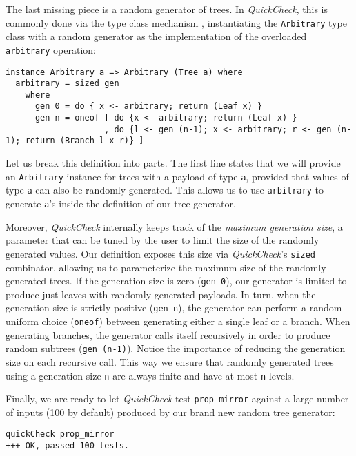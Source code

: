 \documentclass[sigconf, anonymous]{acmart}
\newcommand{\quickcheck}{\textit{QuickCheck}\xspace}
\begin{document}
The last missing piece is a random generator of trees.
%
In \quickcheck, this is commonly done via the type class mechanism
\cite{jones1997type}, instantiating the \texttt{Arbitrary} type class with a
random generator as the implementation of the overloaded \texttt{arbitrary}
operation:

\begin{verbatim}
instance Arbitrary a => Arbitrary (Tree a) where
  arbitrary = sized gen
    where
      gen 0 = do { x <- arbitrary; return (Leaf x) }
      gen n = oneof [ do {x <- arbitrary; return (Leaf x) }
                    , do {l <- gen (n-1); x <- arbitrary; r <- gen (n-1); return (Branch l x r)} ]
\end{verbatim}

\noindent Let us break this definition into parts.
%
The first line states that we will provide an \texttt{Arbitrary} instance for
trees with a payload of type \texttt{a}, provided that values of type \texttt{a}
can also be randomly generated.
%
This allows us to use \texttt{arbitrary} to generate \texttt{a}'s inside the
definition of our tree generator.


Moreover, \quickcheck internally keeps track of the \emph{maximum generation
  size}, a parameter that can be tuned by the user to limit the size of the
randomly generated values.
%
Our definition exposes this size via \quickcheck's \texttt{sized} combinator,
allowing us to parameterize the maximum size of the randomly generated trees.
%
If the generation size is zero (\texttt{gen 0}), our generator is limited to
produce just leaves with randomly generated payloads.
%
In turn, when the generation size is strictly positive (\texttt{gen n}), the
generator can perform a random uniform choice (\texttt{oneof}) between
generating either a single leaf or a branch.
%
When generating branches, the generator calls itself recursively in order to
produce random subtrees (\texttt{gen (n-1)}).
%
Notice the importance of reducing the generation size on each recursive call.
%
This way we ensure that randomly generated trees using a generation size
\texttt{n} are always finite and have at most \texttt{n} levels.

Finally, we are ready to let \quickcheck test \texttt{prop\_mirror} against a
large number of inputs (100 by default) produced by our brand new random tree
generator:

\begin{verbatim}
quickCheck prop_mirror
+++ OK, passed 100 tests.
\end{verbatim}
\end{document}
